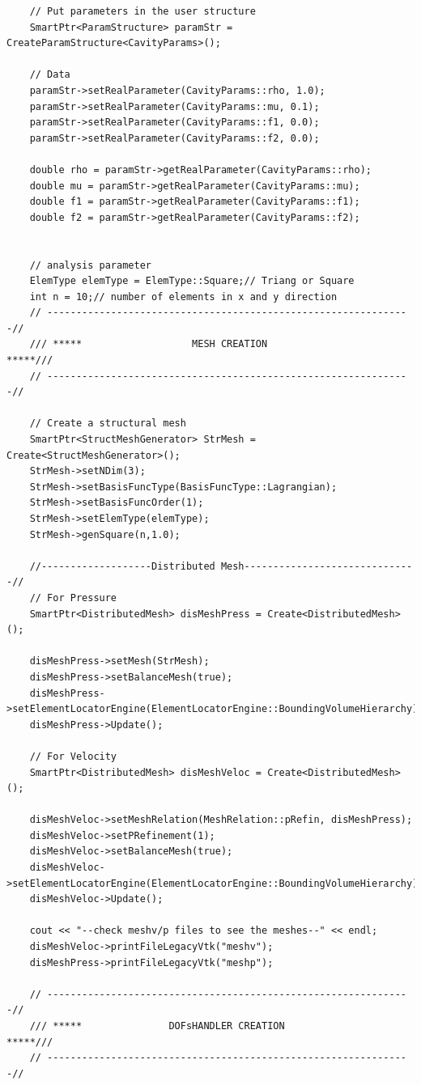 \documentclass[]{article}
\begin{document}
\begin{lstlisting}
	// Put parameters in the user structure
	SmartPtr<ParamStructure> paramStr = CreateParamStructure<CavityParams>();
	
	// Data
	paramStr->setRealParameter(CavityParams::rho, 1.0);
	paramStr->setRealParameter(CavityParams::mu, 0.1);
	paramStr->setRealParameter(CavityParams::f1, 0.0);
	paramStr->setRealParameter(CavityParams::f2, 0.0);
	
	double rho = paramStr->getRealParameter(CavityParams::rho);
	double mu = paramStr->getRealParameter(CavityParams::mu);
	double f1 = paramStr->getRealParameter(CavityParams::f1);
	double f2 = paramStr->getRealParameter(CavityParams::f2);
	
	
	// analysis parameter
	ElemType elemType = ElemType::Square;// Triang or Square
	int n = 10;// number of elements in x and y direction 
	// ---------------------------------------------------------------//
	/// *****                   MESH CREATION                   *****///
	// ---------------------------------------------------------------//
	
	// Create a structural mesh       
	SmartPtr<StructMeshGenerator> StrMesh = Create<StructMeshGenerator>();
	StrMesh->setNDim(3);
	StrMesh->setBasisFuncType(BasisFuncType::Lagrangian);
	StrMesh->setBasisFuncOrder(1);
	StrMesh->setElemType(elemType);
	StrMesh->genSquare(n,1.0);
	
	//-------------------Distributed Mesh------------------------------//
	// For Pressure
	SmartPtr<DistributedMesh> disMeshPress = Create<DistributedMesh>();
	
	disMeshPress->setMesh(StrMesh);
	disMeshPress->setBalanceMesh(true);
	disMeshPress->setElementLocatorEngine(ElementLocatorEngine::BoundingVolumeHierarchy);
	disMeshPress->Update();
	
	// For Velocity
	SmartPtr<DistributedMesh> disMeshVeloc = Create<DistributedMesh>();
	
	disMeshVeloc->setMeshRelation(MeshRelation::pRefin, disMeshPress);
	disMeshVeloc->setPRefinement(1);
	disMeshVeloc->setBalanceMesh(true);
	disMeshVeloc->setElementLocatorEngine(ElementLocatorEngine::BoundingVolumeHierarchy);
	disMeshVeloc->Update();
	
	cout << "--check meshv/p files to see the meshes--" << endl;
	disMeshVeloc->printFileLegacyVtk("meshv");
	disMeshPress->printFileLegacyVtk("meshp");
	
	// ---------------------------------------------------------------//
	/// *****               DOFsHANDLER CREATION                *****///
	// ---------------------------------------------------------------//
	

\end{lstlisting}
\end{document}
